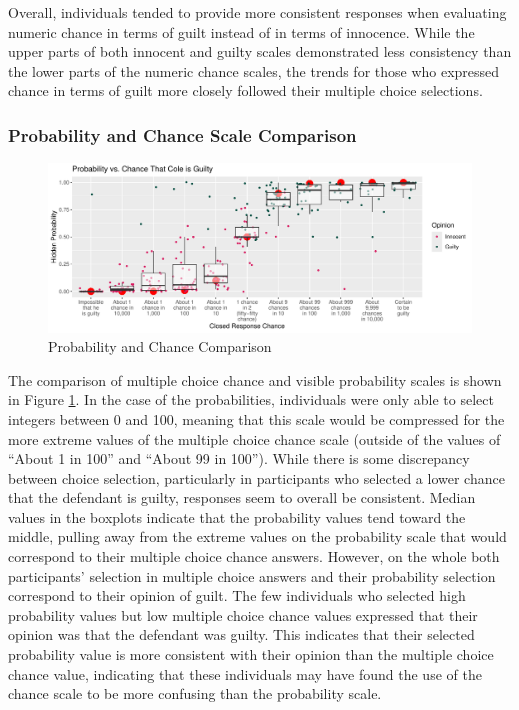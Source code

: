 \documentclass[print]{nuthesis}
\begin{document}
Overall, individuals tended to provide more consistent responses when evaluating numeric chance in terms of guilt instead of in terms of innocence.
While the upper parts of both innocent and guilty scales demonstrated less consistency than the lower parts of the numeric chance scales, the trends for those who expressed chance in terms of guilt more closely followed their multiple choice selections.

\hypertarget{probability-and-chance-scale-comparison}{%
\subsubsection{Probability and Chance Scale Comparison}\label{probability-and-chance-scale-comparison}}

\begin{figure}

{\centering \includegraphics[width=\linewidth]{thesis_files/figure-latex/likeprob-1} 

}

\caption{Probability and Chance Comparison}\label{fig:likeprob}
\end{figure}

The comparison of multiple choice chance and visible probability scales is shown in Figure \ref{fig:likeprob}.
In the case of the probabilities, individuals were only able to select integers between 0 and 100, meaning that this scale would be compressed for the more extreme values of the multiple choice chance scale (outside of the values of ``About 1 in 100'' and ``About 99 in 100'').
While there is some discrepancy between choice selection, particularly in participants who selected a lower chance that the defendant is guilty, responses seem to overall be consistent.
Median values in the boxplots indicate that the probability values tend toward the middle, pulling away from the extreme values on the probability scale that would correspond to their multiple choice chance answers.
However, on the whole both participants' selection in multiple choice answers and their probability selection correspond to their opinion of guilt.
The few individuals who selected high probability values but low multiple choice chance values expressed that their opinion was that the defendant was guilty.
This indicates that their selected probability value is more consistent with their opinion than the multiple choice chance value, indicating that these individuals may have found the use of the chance scale to be more confusing than the probability scale.
\end{document}
